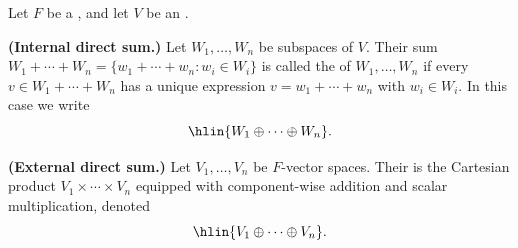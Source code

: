 \begin{definition} \label{definition:direct_sum_of_vector_spaces_internal_and_external}
    Let $F$ be a , and let $V$ be an .

    \textbf{(Internal direct sum.)} Let $W_1, \dots, W_n$ be subspaces of $V$. Their sum $W_1 + \cdots + W_n = \{ w_1 + \cdots + w_n : w_i \in W_i \}$ is called the  of $W_1, \dots, W_n$ if every $v \in W_1 + \cdots + W_n$ has a unique expression $v = w_1 + \cdots + w_n$ with $w_i \in W_i$. In this case we write
    $$\hlin{W_1 \oplus \cdots \oplus W_n}.$$

    \textbf{(External direct sum.)} Let $V_1, \dots, V_n$ be $F$-vector spaces. Their  is the Cartesian product $V_1 \times \cdots \times V_n$ equipped with component-wise addition and scalar multiplication, denoted
    $$\hlin{V_1 \oplus \cdots \oplus V_n}.$$

\end{definition}
